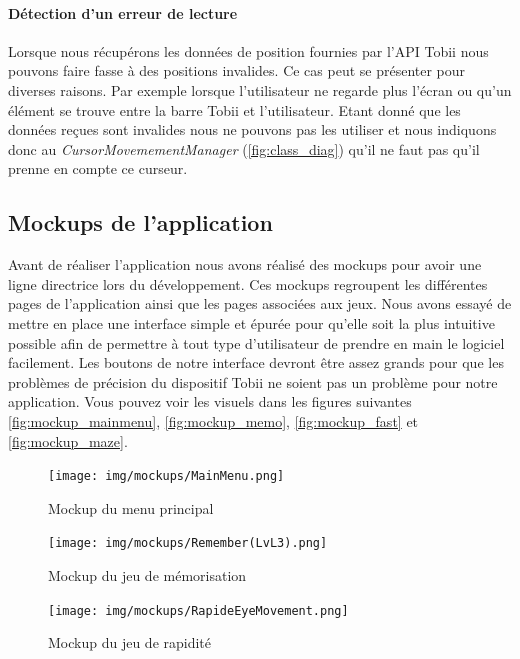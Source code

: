 \documentclass{polytech/polytech}
\begin{document}
\paragraph{Détection d'un erreur de lecture}
Lorsque nous récupérons les données de position fournies par l'API Tobii nous pouvons faire fasse à des positions invalides. Ce cas peut se présenter pour diverses raisons. Par exemple lorsque l'utilisateur ne regarde plus l'écran ou qu'un élément se trouve entre la barre Tobii et l'utilisateur. Etant donné que les données reçues sont invalides nous ne pouvons pas les utiliser et nous indiquons donc au \textit{CursorMovemementManager} (\autoref{fig:class_diag}) qu'il ne faut pas qu'il prenne en compte ce curseur.

\subsection{Mockups de l'application}
\label{sec:mockups}
Avant de réaliser l'application nous avons réalisé des mockups pour avoir une ligne directrice lors du développement. Ces mockups regroupent les différentes pages de l'application ainsi que les pages associées aux jeux. 
Nous avons essayé de mettre en place une interface simple et épurée pour qu'elle soit la plus intuitive possible afin de permettre à tout type d'utilisateur de prendre en main le logiciel facilement. Les boutons de notre interface devront être assez grands pour que les problèmes de précision du dispositif Tobii ne soient pas un problème pour notre application. Vous pouvez voir les visuels dans les figures suivantes \autoref{fig:mockup_mainmenu}, \autoref{fig:mockup_memo}, \autoref{fig:mockup_fast} et \autoref{fig:mockup_maze}.

\begin{figure}
    \centering
    \texttt{[image: img/mockups/MainMenu.png]}
    \caption{Mockup du menu principal}
    \label{fig:mockup_mainmenu}
\end{figure}

\begin{figure}
    \centering
    \texttt{[image: img/mockups/Remember(LvL3).png]}
    \caption{Mockup du jeu de mémorisation}
    \label{fig:mockup_memo}
\end{figure}

\begin{figure}
    \centering
    \texttt{[image: img/mockups/RapideEyeMovement.png]}
    \caption{Mockup du jeu de rapidité}
    \label{fig:mockup_fast}
\end{figure}
\end{document}
